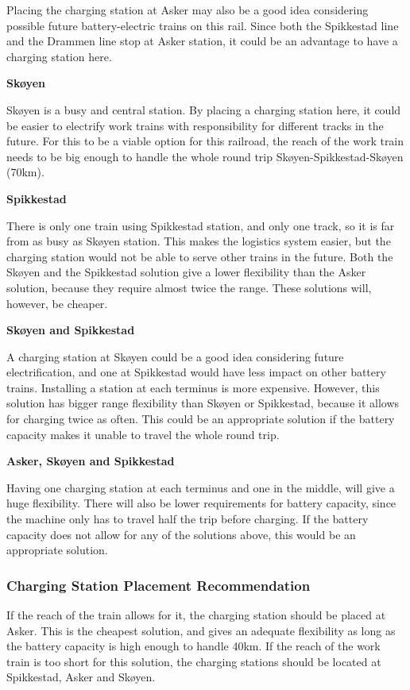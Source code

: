 \documentclass{article}
\begin{document}
Placing the charging station at Asker may also be a good idea considering possible future battery-electric trains on this rail. Since both the Spikkestad line and the Drammen line stop at Asker station, it could be an advantage to have a charging station here. 


\textbf{Skøyen}

Skøyen is a busy and central station. By placing a charging station here, it could be easier to electrify work trains with responsibility for different tracks in the future. For this to be a viable option for this railroad, the reach of the work train needs to be big enough to handle the whole round trip Skøyen-Spikkestad-Skøyen (70km).

\textbf{Spikkestad}

There is only one train using Spikkestad station, and only one track, so it is far from as busy as Skøyen station. This makes the logistics system easier, but the charging station would not be able to serve other trains in the future. Both the Skøyen and the Spikkestad solution give a lower flexibility than the Asker solution, because they require almost twice the range. These solutions will, however, be cheaper.

\textbf{Skøyen and Spikkestad}

A charging station at Skøyen could be a good idea considering future electrification, and one at Spikkestad would have less impact on other battery trains. Installing a station at each terminus is more expensive. However, this solution has bigger range flexibility than Skøyen or Spikkestad, because it allows for charging twice as often. This could be an appropriate solution if the battery capacity makes it unable to travel the whole round trip.

\textbf{Asker, Skøyen and Spikkestad}

Having one charging station at each terminus and one in the middle, will give a huge flexibility. There will also be lower requirements for battery capacity, since the machine only has to travel half the trip before charging. If the battery capacity does not allow for any of the solutions above, this would be an appropriate solution. 

\subsubsection*{Charging Station Placement Recommendation}

If the reach of the train allows for it, the charging station should be placed at Asker. This is the cheapest solution, and gives an adequate flexibility as long as the battery capacity is high enough to handle 40km. If the reach of the work train is too short for this solution, the charging stations should be located at Spikkestad, Asker and Skøyen.
\end{document}
